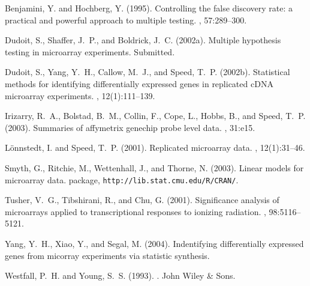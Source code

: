 \documentclass[11pt]{article}
\begin{document}
\begin{thebibliography}{}

Benjamini, Y. and Hochberg, Y. (1995).
\newblock Controlling the false discovery rate: a practical and powerful
  approach to multiple testing.
, 57:289--300.

Dudoit, S., Shaffer, J.~P., and Boldrick, J.~C. (2002a).
\newblock Multiple hypothesis testing in microarray experiments.
\newblock Submitted.

Dudoit, S., Yang, Y.~H., Callow, M.~J., and Speed, T.~P. (2002b).
\newblock Statistical methods for identifying differentially expressed genes in
  replicated c{DNA} microarray experiments.
, 12(1):111--139.

Irizarry, R.~A., Bolstad, B.~M., Collin, F., Cope, L., Hobbs, B., and Speed,
  T.~P. (2003).
\newblock Summaries of affymetrix genechip probe level data.
, 31:e15.

L\"{o}nnstedt, I. and Speed, T.~P. (2001).
\newblock Replicated microarray data.
, 12(1):31--46.

Smyth, G., Ritchie, M., Wettenhall, J., and Thorne, N. (2003).
\newblock Linear models for microarray data.
 package, {\tt http://lib.stat.cmu.edu/R/CRAN/}.

Tusher, V.~G., Tibshirani, R., and Chu, G. (2001).
\newblock Significance analysis of microarrays applied to transcriptional
  responses to ionizing radiation.
, 98:5116--5121.

Yang, Y.~H., Xiao, Y., and Segal, M. (2004).
\newblock Indentifying differentially expressed genes from micorray experiments via 
  statistic synthesis.

Westfall, P.~H. and Young, S.~S. (1993).
.
\newblock John Wiley \& Sons.
\end{thebibliography}
\end{document}
